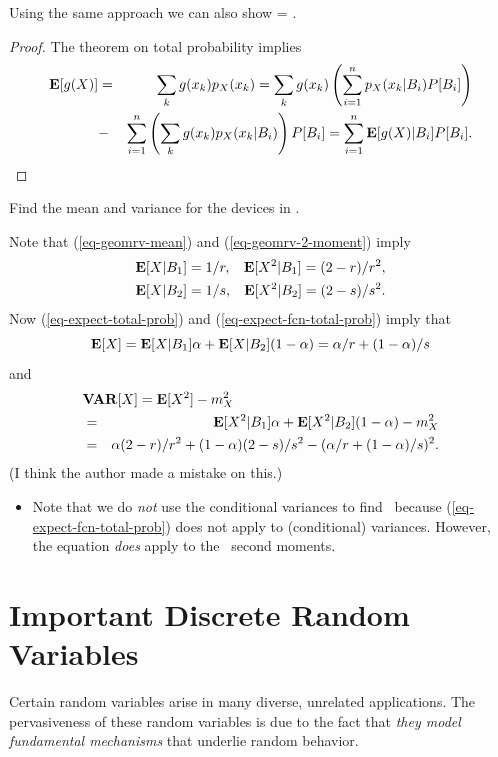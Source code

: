 	\item Using the same approach we can also show
		 = \sumiton {} .
	\eeql
	\begin{proof}
	The theorem on total probability implies
	\begin{eqnarray*}
		{\bf E}[g(X)] &=& \sum_k g(x_k) p_{X}(x_k)
		= \sum_k g(x_k) \left( \sum_{i=1}^{n} p_{X}(x_k|B_i) P[B_i] \right)
		\\&-& \sum_{i=1}^{n} \left( \sum_k g(x_k) p_{X}(x_k|B_i) \right) P[B_i]
		= \sum_{i=1}^{n} {\bf E}[g(X)|B_i] P[B_i].
	\end{eqnarray*}
	\end{proof}

	\item {}
	Find the mean and variance for the devices in .

	Note that (\ref{eq-geomrv-mean}) and (\ref{eq-geomrv-2-moment}) imply
	\begin{eqnarray*}
		&{\bf E}[X|B_1] = 1/r,&
		{\bf E}[X^2|B_1] = (2-r)/r^2,
		\\
		&{\bf E}[X|B_2] = 1/s,&
		{\bf E}[X^2|B_2] = (2-s)/s^2.
	\end{eqnarray*}
	Now (\ref{eq-expect-total-prob}) and (\ref{eq-expect-fcn-total-prob}) imply that
	\[
		{\bf E}[X] = {\bf E}[X|B_1] \alpha +  {\bf E}[X|B_2] (1-\alpha)
		= \alpha/r + (1-\alpha)/s
	\]
	and
	\begin{eqnarray*}
		\lefteqn{
		\VAR{X} = \Exp{X^2} - \expect{X}^2
		}
		\\ &=&
		\cExp{X^2}{B_1} \alpha +  \cExp{X^2}{B_2} (1-\alpha) - \expect{X}^2
		\\ &=&
		\alpha (2-r)/r^2 + (1-\alpha) (2-s)/s^2 - ( \alpha/r + (1-\alpha)/s )^2.
	\end{eqnarray*}
	(I think the author made a mistake on this.)
	\begin{itemize}
		\item Note that we do \emph{not} use the conditional variances
		to find \ because (\ref{eq-expect-fcn-total-prob})
		does not apply to (conditional) variances.
		However, the equation \emph{does} apply to the \cond\ second moments.
	\end{itemize}

\eit

\section{Important Discrete Random Variables}
\bit
	\item Certain random variables arise in many diverse,
	unrelated applications.
	The pervasiveness of these random variables
	is due to the fact
	that \emph{they model fundamental mechanisms} that underlie random behavior.

